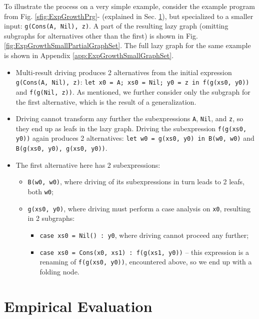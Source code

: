\documentclass[submission,copyright,creativecommons]{eptcs}
\begin{document}
To illustrate the process on a very simple example, consider the example program from 
Fig. \ref{sfig:ExpGrowthPrg}- (explained in Sec. \ref{sec:EmpEval}), 
but specialized to a smaller input: \verb|g(Cons(A, Nil), z)|.
A part of the resulting lazy graph (omitting subgraphs for alternatives other than the first)
is shown in Fig. \ref{fig:ExpGrowthSmallPartialGraphSet}.
The full lazy graph for the same example is shown in Appendix \ref{app:ExpGrowthSmallGraphSet}.
\begin{itemize}
  \item Multi-result driving produces 2 alternatives from the initial expression \verb|g(Cons(A, Nil), z)|:
    \verb|let x0 = A; xs0 = Nil; y0 = z in f(g(xs0, y0))| and \verb|f(g(Nil, z))|.
    As mentioned, we further consider only the subgraph for the first alternative, which
    is the result of a generalization.
  \item Driving cannot transform any further the subexpressions \verb|A|, \verb|Nil|, and \verb|z|, 
    so they end up as leafs in the lazy graph.
    Driving the subexpression \verb|f(g(xs0, y0))| again produces 2 alternatives:
    \verb|let w0 = g(xs0, y0) in B(w0, w0)| and \verb|B(g(xs0, y0), g(xs0, y0))|.
  \item The first alternative here has 2 subexpressions: 
    \begin{itemize}
      \item \verb|B(w0, w0)|, where driving of its subexpressions in turn leads to 2 leafs, both \verb|w0|;
      \item \verb|g(xs0, y0)|, where driving must perform a case analysis on \verb|x0|, resulting in 2 subgraphs:
      \begin{itemize}
        \item \verb|case xs0 = Nil() : y0|, where driving cannot proceed any further;
        \item \verb|case xs0 = Cons(x0, xs1) : f(g(xs1, y0))| -- this expression is a renaming of
          \verb|f(g(xs0, y0))|, encountered above, so we end up with a folding node.
      \end{itemize}
    \end{itemize}
\end{itemize}

\section{Empirical Evaluation}\label{sec:EmpEval}
\end{document}
